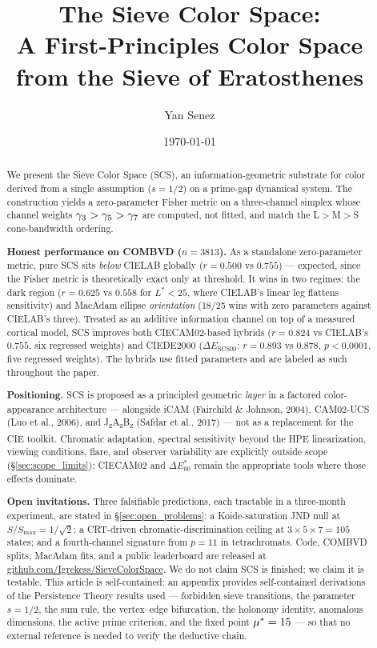 \documentclass[12pt,a4paper]{article}
\title{The Sieve Color Space:\\
A First-Principles Color Space from the Sieve of Eratosthenes}
\author{Yan Senez}
\date{\today}
\begin{document}
\maketitle

\begin{abstract}
We present the Sieve Color Space (SCS), an information-geometric
substrate for color derived from a single assumption ($s = 1/2$) on a
prime-gap dynamical system. The construction yields a zero-parameter
Fisher metric on a three-channel simplex whose channel weights
$\gamma_{3} > \gamma_{5} > \gamma_{7}$ are computed, not fitted, and match
the L$>$M$>$S cone-bandwidth ordering.

\medskip\noindent\textbf{Honest performance on COMBVD ($n = 3813$).}
As a standalone zero-parameter metric, pure SCS sits \emph{below}
CIELAB globally ($r = 0.500$ vs $0.755$) --- expected, since the
Fisher metric is theoretically exact only at threshold. It wins in
two regimes: the dark region ($r = 0.625$ vs $0.558$ for $L^* < 25$,
where CIELAB's linear leg flattens sensitivity) and MacAdam ellipse
\emph{orientation} (18/25 wins with zero parameters against CIELAB's
three). Treated as an additive information channel on top of a
measured cortical model, SCS improves both CIECAM02-based hybrids
($r = 0.824$ vs CIELAB's $0.755$, six regressed weights) and
CIEDE2000 ($\Delta E_{\mathrm{SCS00}}$: $r = 0.893$ vs $0.878$,
$p < 0.0001$, five regressed weights). The hybrids use fitted
parameters and are labeled as such throughout the paper.

\medskip\noindent\textbf{Positioning.} SCS is proposed as a principled
geometric \emph{layer} in a factored color-appearance architecture ---
alongside iCAM (Fairchild \& Johnson, 2004), CAM02-UCS (Luo et al.,
2006), and J\textsubscript{z}A\textsubscript{z}B\textsubscript{z}
(Safdar et al., 2017) --- not as a replacement for the CIE toolkit.
Chromatic adaptation, spectral sensitivity beyond the HPE
linearization, viewing conditions, flare, and observer variability
are explicitly outside scope (\S\ref{sec:scope_limits}); CIECAM02 and
$\Delta E^*_{00}$ remain the appropriate tools where those effects
dominate.

\medskip\noindent\textbf{Open invitations.} Three falsifiable
predictions, each tractable in a three-month experiment, are stated
in \S\ref{sec:open_problems}: a Koide-saturation JND null at
$S/S_{\max} = 1/\sqrt{2}$; a CRT-driven chromatic-discrimination
ceiling at $3 \times 5 \times 7 = 105$ states; and a fourth-channel
signature from $p = 11$ in tetrachromats. Code, COMBVD splits,
MacAdam fits, and a public leaderboard are released at
\href{https://github.com/Igrekess/SieveColorSpace}{github.com/Igrekess/SieveColorSpace}.
We do not claim SCS is finished; we claim it is testable.
This article is self-contained: an appendix provides self-contained
derivations of the Persistence Theory results used --- forbidden sieve
transitions, the parameter $s = 1/2$, the sum rule, the vertex--edge
bifurcation, the holonomy identity, anomalous dimensions, the active
prime criterion, and the fixed point ${\mu^{*}} = 15$ --- so that no
external reference is needed to verify the deductive chain.
\end{abstract}
\end{document}
